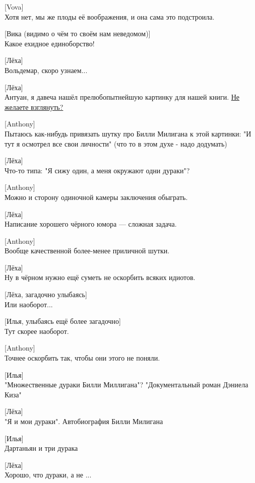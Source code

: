 [Vova]\\
Хотя нет, мы же плоды её воображения, и она сама это подстроила.


[Вика (видимо о чём то своём нам неведомом)]\\
Какое ехидное единоборство!


[Лёха]\\
Вольдемар, скоро узнаем...


[Лёха]\\
Антуан, я давеча нашёл прелюбопытнейшую картинку для нашей книги. \href{http://cs8.pikabu.ru/post_img/2016/10/14/5/1476431396146890414.jpg}{Не желаете взглянуть?}


[Anthony]\\
Пытаюсь как-нибудь привязать шутку про Билли Милигана к этой картинки: "И тут я осмотрел все свои личности" (что то в этом духе - надо додумать)


[Лёха]\\
Что-то типа: "Я сижу один, а меня окружают одни дураки"?


[Anthony]\\
Можно и сторону одиночной камеры заключения обыграть.


[Лёха]\\
Написание хорошего чёрного юмора — сложная задача.


[Anthony]\\
Вообще качественной более-менее приличной шутки.


[Лёха]\\
Ну в чёрном нужно ещё суметь не оскорбить всяких идиотов.


[Лёха, загадочно улыбаясь]\\
Или наоборот...


[Илья, улыбаясь ещё более загадочно]\\
Тут скорее наоборот.


[Anthony]\\
Точнее оскорбить так, чтобы они этого не поняли.


[Илья]\\
"Множественные дураки Билли Миллигана"?
"Документальный роман Дэниела Киза"


[Лёха]\\
"Я и мои дураки". Автобиография Билли Милигана


[Илья]\\
Дартаньян и три дурака


[Лёха]\\
Хорошо, что дураки, а не ...


